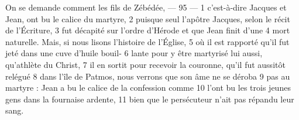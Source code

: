 On se demande comment les fils de Zébédée,	 
 	--- 95 ---	 
1	 	c'est-à-dire Jacques et Jean, ont bu le calice du martyre,	 
2	 	puisque seul l'apôtre Jacques, selon le récit de l'Écriture,	 
3	 	fut décapité sur l'ordre d'Hérode et que Jean finit d'une	 
4	 	mort naturelle. Mais, si nous lisons l'histoire de l'Église,	 
5	 	où il est rapporté qu'il fut jeté dans une cuve d'huile bouil-	 
6	 	lante pour y être martyrisé lui aussi, qu'athlète du Christ,	 
7	 	il en sortit pour recevoir la couronne, qu'il fut aussitôt relégué	 
8	 	dans l'île de Patmos, nous verrons que son âme ne se déroba	 
9	 	pas au martyre : Jean a bu le calice de la confession comme	 
10	 	l'ont bu les trois jeunes gens dans la fournaise ardente,	 
11	 	bien que le persécuteur n'ait pas répandu leur sang.